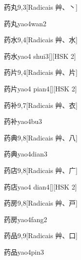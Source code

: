 \begin{entry}{药丸}{9,3}[Radicais ⾋、⼂]
  \begin{phonetics}{药丸}{yao4wan2}
  \end{phonetics}
\end{entry}

\begin{entry}{药水}{9,4}[Radicais ⾋、⽔]
  \begin{phonetics}{药水}{yao4 shui3}[][HSK 2]
  \end{phonetics}
\end{entry}

\begin{entry}{药片}{9,4}[Radicais ⾋、⽚]
  \begin{phonetics}{药片}{yao4 pian4}[][HSK 2]
  \end{phonetics}
\end{entry}

\begin{entry}{药补}{9,7}[Radicais ⾋、⾐]
  \begin{phonetics}{药补}{yao4bu3}
  \end{phonetics}
\end{entry}

\begin{entry}{药典}{9,8}[Radicais ⾋、⼋]
  \begin{phonetics}{药典}{yao4dian3}
  \end{phonetics}
\end{entry}

\begin{entry}{药店}{9,8}[Radicais ⾋、⼴]
  \begin{phonetics}{药店}{yao4 dian4}[][HSK 2]
  \end{phonetics}
\end{entry}

\begin{entry}{药房}{9,8}[Radicais ⾋、⼾]
  \begin{phonetics}{药房}{yao4fang2}
  \end{phonetics}
\end{entry}

\begin{entry}{药品}{9,9}[Radicais ⾋、⼝]
  \begin{phonetics}{药品}{yao4pin3}
  \end{phonetics}
\end{entry}

